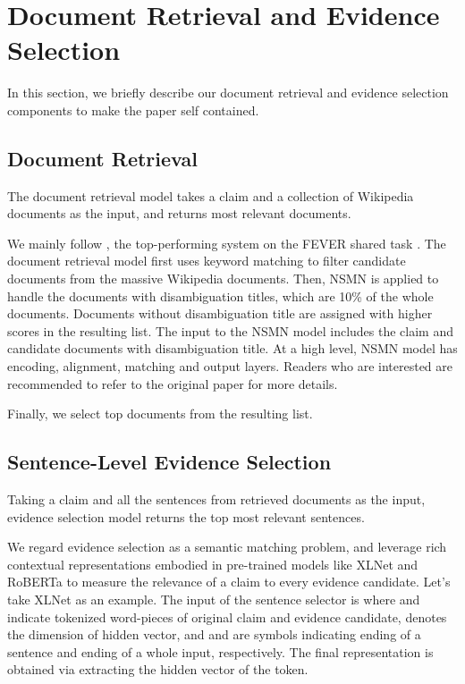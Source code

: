 \documentclass[11pt,a4paper]{article}
\begin{document}
\section{Document Retrieval and Evidence Selection}
In this section, we briefly describe our \mbox{document} retrieval and evidence selection components to make the paper self contained.
\label{sec:document-and-sentence-retrieval}
\subsection{Document Retrieval}
\label{sec:document-retrieval}
The document retrieval model takes a claim and a collection of Wikipedia documents as the input, and returns  most relevant documents. 

We mainly follow , 
the top-performing system on the 
FEVER shared task \cite{thorne2018fact}. 
The document retrieval model first uses {keyword matching} to filter candidate documents from the massive Wikipedia documents.
Then, NSMN \cite{nie2019combining} is applied to handle the documents with disambiguation titles, which are 10\% of the whole documents.
Documents without disambiguation title are assigned with higher scores in the resulting list.
The input to the NSMN model includes
the claim and candidate documents with disambiguation title.
At a high level, NSMN model has 
encoding, alignment, matching and output layers. 
Readers who are interested are recommended to refer to the original paper for more details.




Finally, we select top  documents from the resulting list.


\subsection{Sentence-Level Evidence Selection}
Taking a claim and all the sentences from retrieved documents as the input,
evidence selection model returns the top  most relevant sentences.
\par 
We regard evidence selection as a semantic matching problem, and leverage rich contextual representations embodied in pre-trained models like {XLNet} \cite{yang2019xlnet} and RoBERTa \cite{liu2019roberta} to measure the relevance of a claim to every evidence candidate.
Let's take XLNet as an example.
The input of the sentence selector is  where  and  indicate tokenized word-pieces of original claim and  evidence candidate,  denotes the dimension of hidden vector, and  and  are symbols indicating ending of a sentence and ending of a whole input, respectively.
The final representation  is obtained via extracting the hidden vector of the  token. 
\end{document}
